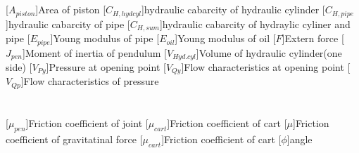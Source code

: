 \section*{}
\begin{acronym}[LONGEST]
    [\ensuremath{A_{piston}}]{\acrounit{\qm}Area of piston}
    [\ensuremath{C_{H,hydcyl}}]{\acrounit{\m^5\per\N}hydraulic cabarcity of hydraulic cylinder}
    [\ensuremath{C_{H,pipe}}]{\acrounit{\m^5\per\N}hydraulic cabarcity of pipe}
    [\ensuremath{C_{H,sum}}]{\acrounit{\m^5\per\N}hydraulic cabarcity of hydraylic cyliner and pipe}
    [\ensuremath{E_{pipe}}]{\acrounit{\N\per\qm}Young modulus of pipe}
    [\ensuremath{E_{oil}}]{\acrounit{\N\per\qm}Young modulus of oil}
    [\ensuremath{F}]{\acrounit{\N}Extern force}
    [\ensuremath{J_{pen}}]{\acrounit{\kg\qm}Moment of inertia of pendulum}
    [\ensuremath{V_{Hyd.cyl}}]{\acrounit{\cubic\m}Volume of hydraulic cylinder(one side)}
    [\ensuremath{V_{Py}}]{\acrounit{\bar\per\%}Pressure at opening point}
    [\ensuremath{V_{Qy}}]{\acrounit{\cubic\m\per\s\per\%}Flow characteristics at opening point}
    [\ensuremath{V_{Qp}}]{\acrounit{\cubic\m\per\s\per\Pa}Flow characteristics of pressure}
\end{acronym}
\section*{}
\begin{acronym}[LONGEST]
    [\ensuremath{\mu_{pen}}]{\acrounit{-}Friction coefficient of joint}
    [\ensuremath{\mu_{cart}}]{\acrounit{-}Friction coefficient of cart}
    [\ensuremath{\mu}]{\acrounit{-}Friction coefficient of gravitatinal force}
    [\ensuremath{\mu_{cart}}]{\acrounit{-}Friction coefficient of cart}
    [\ensuremath{\phi}]{angle}
\end{acronym}
%

